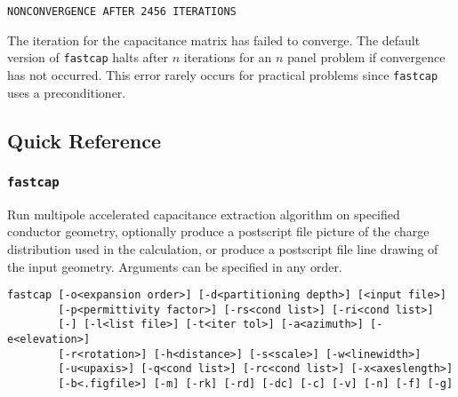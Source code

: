\begin{verbatim}
NONCONVERGENCE AFTER 2456 ITERATIONS
\end{verbatim}\vspace{-\topsep}
The iteration for the capacitance matrix has failed to converge. The
default version of {\tt fastcap} halts after $n$ iterations for an
$n$ panel problem if convergence has not occurred. 
This error rarely occurs for practical problems since
{\tt fastcap} uses a preconditioner.




\subsection{Quick Reference}
\label{quiref}

\subsubsection*{\tt fastcap}

Run multipole accelerated capacitance extraction algorithm on specified 
conductor geometry, optionally produce a postscript file picture of
the charge distribution used in the calculation, or produce a postscript 
file line drawing of the input geometry. Arguments can be specified in
any order.
\begin{verbatim}
fastcap [-o<expansion order>] [-d<partitioning depth>] [<input file>]
        [-p<permittivity factor>] [-rs<cond list>] [-ri<cond list>]
        [-] [-l<list file>] [-t<iter tol>] [-a<azimuth>] [-e<elevation>]
        [-r<rotation>] [-h<distance>] [-s<scale>] [-w<linewidth>]
        [-u<upaxis>] [-q<cond list>] [-rc<cond list>] [-x<axeslength>]
        [-b<.figfile>] [-m] [-rk] [-rd] [-dc] [-c] [-v] [-n] [-f] [-g]
\end{verbatim}

